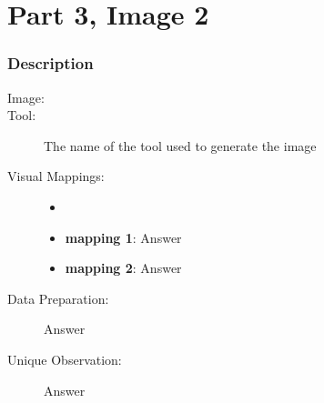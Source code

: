 \hypertarget{part-3-image-2}{%
\section{Part 3, Image 2}\label{part-1-design-5}}


\centering


\hypertarget{description}{%
	\subsubsection{Description}\label{description}}

\begin{description}
	\item[Image:]
	\item[Tool:]
	The name of the tool used to generate the image
	\item[Visual Mappings:]
	\begin{itemize}
		\tightlist
		\item[ ]
	\end{itemize}
	\begin{itemize}
		\tightlist
		\item
		\textbf{mapping 1}: Answer
	\end{itemize}
	
	\begin{itemize}
		\tightlist
		\item
		\textbf{mapping 2}: Answer
	\end{itemize}
	\item[Data Preparation:] Answer
	\item[Unique Observation:]
	Answer
	
\end{description}